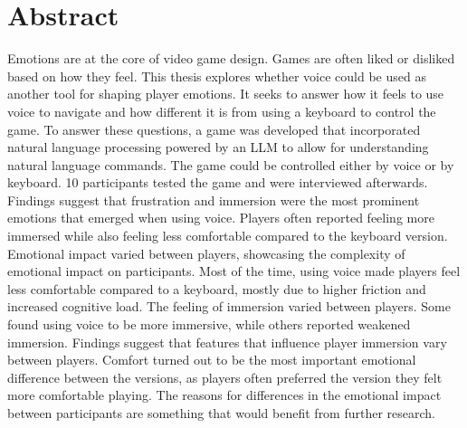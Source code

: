 
\chapter*{Abstract}
\label{ch:abstract}





Emotions are at the core of video game design. Games are often liked or disliked based on how they feel. This thesis explores whether voice could be used as another tool for shaping player emotions. 
It seeks to answer how it feels to use voice to navigate and how different it is from using a keyboard to control the game.
To answer these questions, a game was developed that incorporated natural language processing powered by an LLM to allow for understanding natural language commands. The game could be controlled either by voice or by keyboard.
10 participants tested the game and were interviewed afterwards. 
Findings suggest that frustration and immersion were the most prominent emotions that emerged when using voice.
Players often reported feeling more immersed while also feeling less comfortable compared to the keyboard version.
Emotional impact varied between players, showcasing the complexity of emotional impact on participants.
Most of the time, using voice made players feel less comfortable compared to a keyboard, mostly due to higher friction and increased cognitive load.
The feeling of immersion varied between players. Some found using voice to be more immersive, while others reported weakened immersion. 
Findings suggest that features that influence player immersion vary between players.
Comfort turned out to be the most important emotional difference between the versions, as players often preferred the version they felt more comfortable playing.
The reasons for differences in the emotional impact between participants are something that would benefit from further research.

